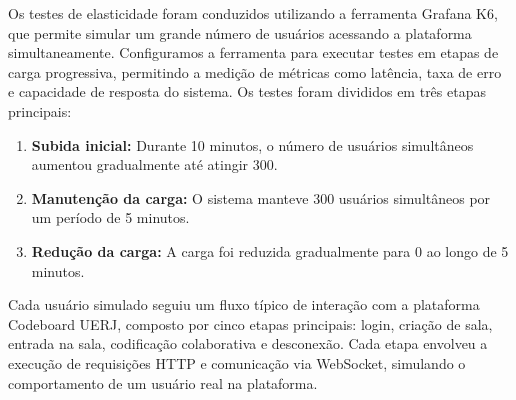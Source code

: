 Os testes de elasticidade foram conduzidos utilizando a ferramenta Grafana K6, que permite simular um grande número de usuários acessando a plataforma simultaneamente. Configuramos a ferramenta para executar testes em etapas de carga progressiva, permitindo a medição de métricas como latência, taxa de erro e capacidade de resposta do sistema. Os testes foram divididos em três etapas principais:

\begin{enumerate}
    \item \textbf{Subida inicial:} Durante 10 minutos, o número de usuários simultâneos aumentou gradualmente até atingir 300.
    \item \textbf{Manutenção da carga:} O sistema manteve 300 usuários simultâneos por um período de 5 minutos.
    \item \textbf{Redução da carga:} A carga foi reduzida gradualmente para 0 ao longo de 5 minutos.
\end{enumerate}

Cada usuário simulado seguiu um fluxo típico de interação com a plataforma Codeboard UERJ, composto por cinco etapas principais: login, criação de sala, entrada na sala, codificação colaborativa e desconexão. Cada etapa envolveu a execução de requisições HTTP e comunicação via WebSocket, simulando o comportamento de um usuário real na plataforma.

